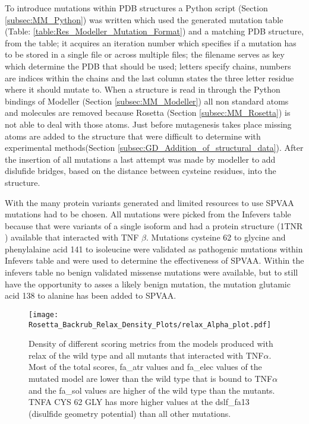 	\newpage
	To introduce mutations within PDB structures a Python script (Section \ref{subsec:MM_Python}) was written which used the generated mutation table (Table: \ref{table:Res_Modeller_Mutation_Format}) and a matching PDB structure, from the table; it acquires an iteration number which specifies if a mutation has to be stored in a single file or across multiple files; the filename serves as key which determine the PDB that should be used; letters specify chains, numbers are indices within the chains and the last column states the three letter residue where it should mutate to. When a structure is read in through the Python bindings of Modeller (Section \ref{subsec:MM_Modeller}) all non standard atoms and molecules are removed because Rosetta (Section \ref{subsec:MM_Rosetta}) is not able to deal with those atoms. Just before mutagenesis takes place missing atoms are added to the structure that were difficult to determine with experimental methods(Section \ref{subsec:GD_Addition_of_structural_data}). After the insertion of all mutations a last attempt was made by modeller to add dislufide bridges, based on the distance between cysteine residues, into the structure.
	
	With the many protein variants generated and limited resources to use SPVAA mutations had to be chosen. All mutations were picked from the Infevers table because that were variants of a single isoform and had a protein structure (1TNR \cite{}) available that interacted with TNF $\beta$. 
	Mutations cysteine 62 to glycine and phenylalaine acid 141 to isoleucine were validated as pathogenic mutations within Infevers table and were used to determine the effectiveness of SPVAA. Within the infevers table no benign validated missense mutations were available, but to still have the opportunity to asses a likely benign mutation, the mutation glutamic acid 138 to alanine has been added to SPVAA.	
	
	\newpage
	\begin{figure}[!ht]
		\centering
		\texttt{[image: Rosetta\_Backrub\_Relax\_Density\_Plots/relax\_Alpha\_plot.pdf]}
		\caption[TNFRSF1A homotimer with TNF$\alpha$ homotrimer relax score density plots]{Density of different scoring metrics from the models produced with relax of the wild type and all mutants that interacted with TNF$\alpha$. Most of the total scores, fa\_atr values and fa\_elec values of the mutated model are lower than the wild type that is bound to TNF$\alpha$ and the fa\_sol values are higher of the wild type than the mutants. TNFA CYS 62 GLY has more higher values at the dslf\_fa13 (disulfide geometry potential) than all other mutations.}
		\label{fig:relax_TNFA_scores}
	\end{figure}

